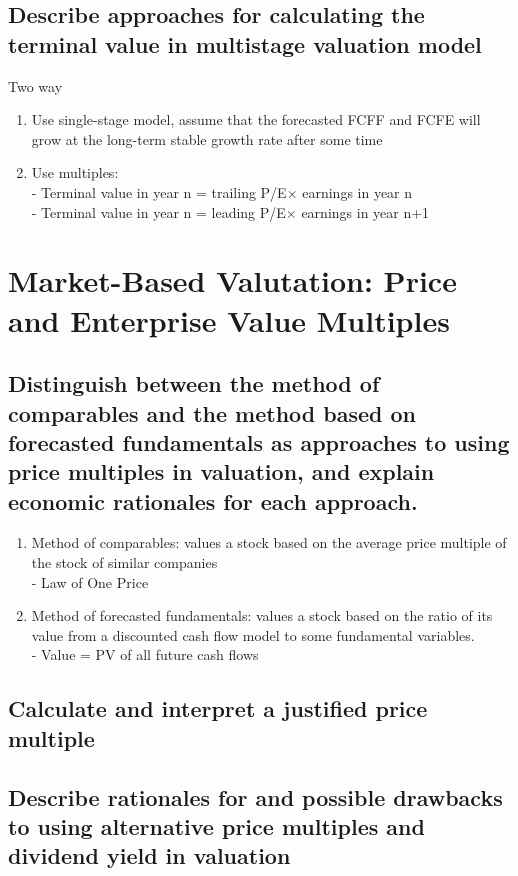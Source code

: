 \documentclass{article}
\newcommand{\be}{\begin{enumerate}}
\newcommand{\ee}{\end{enumerate}}
\begin{document}
\subsection{Describe approaches for calculating the terminal value in multistage valuation model}
Two way
\be
    \item Use single-stage model, assume that the forecasted FCFF and FCFE will grow at
        the long-term stable growth rate after some time
    \item Use multiples: 
        \\- Terminal value in year n = trailing P/E$\times$ earnings in year n
        \\- Terminal value in year n = leading P/E$\times$ earnings in year n+1
\ee


\section{Market-Based Valutation: Price and Enterprise Value Multiples}
\subsection{Distinguish between the method of comparables and the method based on
forecasted fundamentals as approaches to using price multiples in valuation, and
explain economic rationales for each approach.}
\be
    \item Method of comparables: values a stock based on the average price multiple
        of the stock of similar companies
        \\- Law of One Price
    \item Method of forecasted fundamentals: values a stock based on the ratio of
        its value from a discounted cash flow model to some fundamental variables.
        \\- Value = PV of all future cash flows
\ee 
\subsection{Calculate and interpret a justified price multiple}
\subsection{Describe rationales for and possible drawbacks to using alternative price multiples
and dividend yield in valuation}
\end{document}
